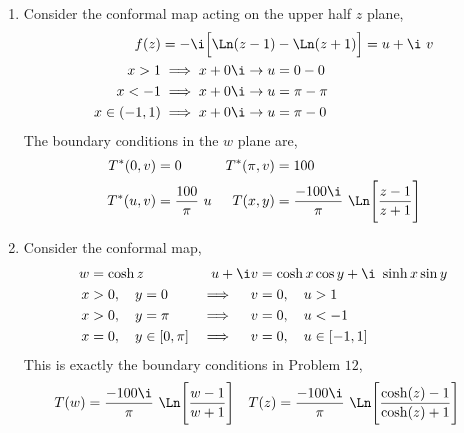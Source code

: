 \begin{enumerate}
    \item Consider the conformal map acting on the upper half $ z $ plane,
          \begin{align}
              f(z)          & = -\i \Big[\Ln(z-1) - \Ln(z+1)\Big] = u + \i\ v \\
              x > 1         & \implies x + 0\i \to u = 0 - 0                  \\
              x < -1        & \implies x + 0\i \to u = \pi - \pi              \\
              x \in (-1, 1) & \implies x + 0\i \to u = \pi - 0
          \end{align}
          The boundary conditions in the $ w $ plane are,
          \begin{align}
              T^*(0, v)   & = 0                                                  &
              T^*(\pi, v) & = 100                                                  \\
              T^*(u, v)   & = \frac{100}{\pi}\ u                                 &
              T(x, y)     & = \frac{-100\i}{\pi}\ \Ln\Bigg[\frac{z-1}{z+1}\Bigg]
          \end{align}

    \item Consider the conformal map,
          \begin{align}
              w                & = \cosh z                             &
              u + \i v         & = \cosh x \cos y + \i\ \sinh x \sin y   \\
              x                & > 0, \quad  y = 0                     &
              \implies \quad v & = 0, \quad u > 1                        \\
              x                & > 0, \quad  y = \pi                   &
              \implies \quad v & = 0, \quad u < -1                       \\
              x                & = 0, \quad  y \in [0, \pi]            &
              \implies \quad v & = 0, \quad u \in [-1, 1]
          \end{align}
          This is exactly the boundary conditions in Problem $ 12 $,
          \begin{align}
              T(w) & = \frac{-100\i}{\pi}\ \Ln\Bigg[\frac{w-1}{w+1}\Bigg]               &
              T(z) & = \frac{-100\i}{\pi}\ \Ln\Bigg[\frac{\cosh(z)-1}{\cosh(z)+1}\Bigg]
          \end{align}


\end{enumerate}
